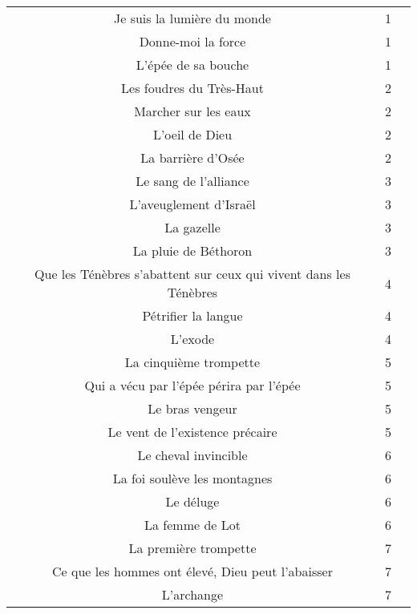 \begin{center}
\begin{supertabular}{|c|c|c|}
Je suis la lumière du monde & 1 & \cite[p.237]{MC} \\
Donne-moi la force & 1 & \cite[p.237]{MC} \\
L'épée de sa bouche & 1 & \cite[p.237]{MC} \\ 
Les foudres du Très-Haut & 2 & \cite[p.237]{MC} \\ 
Marcher sur les eaux & 2 & \cite[p.237]{MC} \\
L'oeil de Dieu & 2 & \cite[p.237]{MC} \\
La barrière d'Osée & 2 & \cite[p.228]{MC} \\ 
Le sang de l'alliance & 3 & \cite[p.238]{MC} \\     
L'aveuglement d'Israël & 3 & \cite[p.238]{MC} \\
La gazelle & 3 & \cite[p.238]{MC} \\
La pluie de Béthoron & 3 & \cite[p.238]{MC} \\ 
Que les Ténèbres s'abattent sur ceux qui vivent dans les Ténèbres & 4 & \cite[p.238]{MC} \\ 
Pétrifier la langue & 4 & \cite[p.238]{MC} \\
L'exode & 4 & \cite[p.238]{MC} \\
La cinquième trompette & 5 & \cite[p.239]{MC} \\ 
Qui a vécu par l'épée périra par l'épée & 5 & \cite[p.239]{MC} \\ 
Le bras vengeur & 5 & \cite[p.239]{MC} \\
Le vent de l'existence précaire & 5 & \cite[p.239]{MC} \\
Le cheval invincible & 6 & \cite[p.239]{MC} \\ 
La foi soulève les montagnes & 6 & \cite[p.239]{MC} \\ 
Le déluge & 6 & \cite[p.239]{MC} \\
La femme de Lot & 6 & \cite[p.240]{MC} \\
La première trompette & 7 & \cite[p.240]{MC} \\ 
Ce que les hommes ont élevé, Dieu peut l'abaisser & 7 & \cite[p.240]{MC} \\ 
L'archange & 7 & \cite[p.240]{MC} \\

\end{supertabular}
\end{center}

